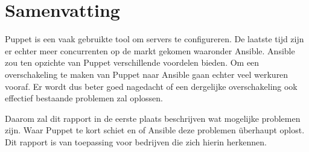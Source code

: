 





\chapter*{Samenvatting}
Puppet is een vaak gebruikte tool om servers te configureren. De laatste tijd zijn er echter meer concurrenten op de markt gekomen waaronder Ansible. Ansible zou ten opzichte van Puppet verschillende voordelen bieden. Om een overschakeling te maken van Puppet naar Ansible gaan echter veel werkuren vooraf. Er wordt dus beter goed nagedacht of een dergelijke overschakeling ook effectief bestaande problemen zal oplossen.

Daarom zal dit rapport in de eerste plaats beschrijven wat mogelijke problemen zijn. Waar Puppet te kort schiet en of Ansible deze problemen \"uberhaupt oplost. Dit rapport is van toepassing voor bedrijven die zich hierin herkennen.

